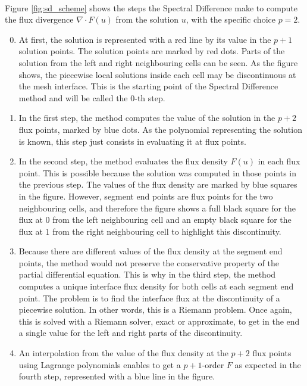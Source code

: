       \paragraph{}
      Figure \ref{fig:sd_scheme} shows the steps the Spectral Difference make to compute the flux divergence $\nabla \cdot F\left(u\right)$ from the solution $u$, with the specific choice $p = 2$.
      \begin{enumerate}
        \setcounter{enumi}{-1}
        \item At first, the solution is represented with a red line by its value in the $p + 1$ solution points.
        The solution points are marked by red dots.
        Parts of the solution from the left and right neighbouring cells can be seen.
        As the figure shows, the piecewise local solutions inside each cell may be discontinuous at the mesh interface.
        This is the starting point of the Spectral Difference method and will be called the 0-th step.
        \item In the first step, the method computes the value of the solution in the $p + 2$ flux points, marked by blue dots.
        As the polynomial representing the solution is known, this step just consists in evaluating it at flux points.
        \item In the second step, the method evaluates the flux density $F\left(u\right)$ in each flux point.
        This is possible because the solution was computed in those points in the previous step.
        The values of the flux density are marked by blue squares in the figure.
        However, segment end points are flux points for the two neighbouring cells, and therefore the figure shows a full black square for the flux at $0$ from the left neighbouring cell and an empty black square for the flux at $1$ from the right neighbouring cell to highlight this discontinuity.
        \item Because there are different values of the flux density at the segment end points, the method would not preserve the conservative property of the partial differential equation.
        This is why in the third step, the method computes a unique interface flux density for both cells at each segment end point.
        The problem is to find the interface flux at the discontinuity of a piecewise solution.
        In other words, this is a Riemann problem.
        Once again, this is solved with a Riemann solver, exact or approximate, to get in the end a single value for the left and right parts of the discontinuity.
        \item An interpolation from the value of the flux density at the $p + 2$ flux points using Lagrange polynomials enables to get a $p\!+\!1$-order $F$ as expected in the fourth step, represented with a blue line in the figure.

\end{enumerate}
